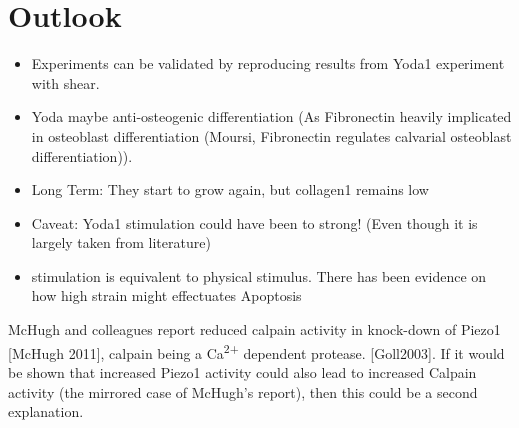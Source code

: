 \chapter{Outlook}

\begin{itemize}
    \item Experiments can be validated by reproducing results from Yoda1 experiment with shear.
    \item Yoda maybe anti-osteogenic differentiation (As Fibronectin heavily implicated in osteoblast differentiation (Moursi, Fibronectin regulates calvarial osteoblast differentiation)).
    \item Long Term: They start to grow again, but collagen1 remains low
    \item Caveat: Yoda1 stimulation could have been to strong! (Even though it is largely taken from literature)
    \item \Piezo{} stimulation is equivalent to physical stimulus. There has been evidence on how high strain might effectuates Apoptosis
\end{itemize}

McHugh and colleagues report reduced calpain activity in knock-down of Piezo1 [McHugh 2011], calpain being a Ca\textsuperscript{2+} dependent protease. [Goll2003]. If it would be shown that increased Piezo1 activity could also lead to increased Calpain activity (the mirrored case of McHugh's report), then this could be a second explanation.